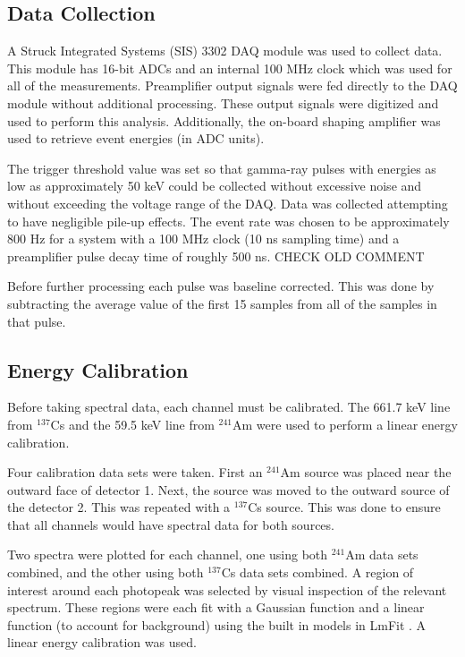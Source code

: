 \subsection{Data Collection}

A Struck Integrated Systems (SIS) 3302 DAQ module was used to collect data. This module has 16-bit ADCs and an internal 100 MHz clock which was used for all of the measurements. Preamplifier output signals were fed directly to the DAQ module without additional processing. These output signals were digitized and used to perform this analysis. Additionally, the on-board shaping amplifier was used to retrieve event energies (in ADC units).

The trigger threshold value was set so that gamma-ray pulses with energies as low as approximately 50 keV could be collected without excessive noise and without exceeding the voltage range of the DAQ. Data was collected attempting to have negligible pile-up effects. The event rate was chosen to be approximately 800 Hz for a system with a 100 MHz clock (10 ns sampling time) and a preamplifier pulse decay time of roughly 500 ns. CHECK OLD COMMENT

Before further processing each pulse was baseline corrected. This was done by subtracting the average value of the first 15 samples from all of the samples in that pulse.

\subsection{Energy Calibration}

Before taking spectral data, each channel must be calibrated. The 661.7 keV line from ${}^{137}$Cs and the 59.5 keV line from ${}^{241}$Am were used to perform a linear energy calibration.

Four calibration data sets were taken. First an ${}^{241}$Am source was placed near the outward face of detector 1. Next, the source was moved to the outward source of the detector 2. This was repeated with a ${}^{137}$Cs source. This was done to ensure that all channels would have spectral data for both sources.

Two spectra were plotted for each channel, one using both ${}^{241}$Am data sets combined, and the other using both ${}^{137}$Cs data sets combined. A region of interest around each photopeak was selected by visual inspection of the relevant spectrum. These regions were each fit with a Gaussian function and a linear function (to account for background) using the built in models in LmFit \cite{LMFIT}. A linear energy calibration was used.

